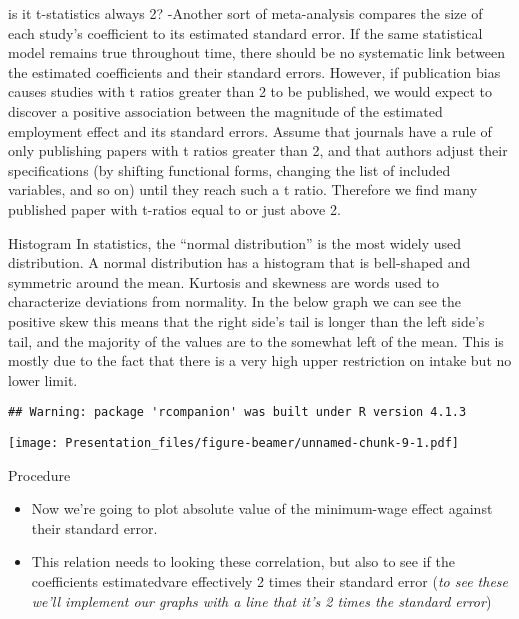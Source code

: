 \documentclass[
  9 pt,
  ignorenonframetext,
]{beamer}
\begin{document}
\begin{frame}{is it t-statistics always 2?}
\protect\hypertarget{is-it-t-statistics-always-2}{}
-Another sort of meta-analysis compares the size of each study's
coefficient to its estimated standard error. If the same statistical
model remains true throughout time, there should be no systematic link
between the estimated coefficients and their standard errors. However,
if publication bias causes studies with t ratios greater than 2 to be
published, we would expect to discover a positive association between
the magnitude of the estimated employment effect and its standard
errors. Assume that journals have a rule of only publishing papers with
t ratios greater than 2, and that authors adjust their specifications
(by shifting functional forms, changing the list of included variables,
and so on) until they reach such a t ratio. Therefore we find many
published paper with t-ratios equal to or just above 2.
\end{frame}

\begin{frame}[fragile]{Histogram}
\protect\hypertarget{histogram}{}
In statistics, the ``normal distribution'' is the most widely used
distribution. A normal distribution has a histogram that is bell-shaped
and symmetric around the mean. Kurtosis and skewness are words used to
characterize deviations from normality. In the below graph we can see
the positive skew this means that the right side's tail is longer than
the left side's tail, and the majority of the values are to the somewhat
left of the mean. This is mostly due to the fact that there is a very
high upper restriction on intake but no lower limit.

\begin{verbatim}
## Warning: package 'rcompanion' was built under R version 4.1.3
\end{verbatim}

\texttt{[image: Presentation\_files/figure-beamer/unnamed-chunk-9-1.pdf]}
\end{frame}

\begin{frame}{Procedure}
\protect\hypertarget{procedure-2}{}
\begin{itemize}
\item
  Now we're going to plot absolute value of the minimum-wage effect
  against their standard error.
\item
  This relation needs to looking these correlation, but also to see if
  the coefficients estimatedvare effectively 2 times their standard
  error (\emph{to see these we'll implement our graphs with a line that
  it's 2 times the standard error})
\end{itemize}
\end{frame}
\end{document}
